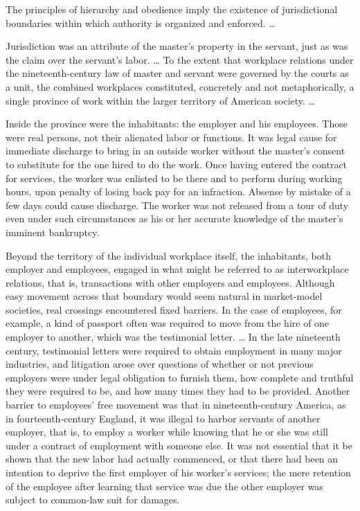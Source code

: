 \documentclass[
  letterpaper,
  11pt,
  DIV=9,
  openright]{scrbook}
\begin{document}
The principles of hierarchy and obedience imply the existence of
jurisdictional boundaries within which authority is organized and
enforced. \ldots{}

Jurisdiction was an attribute of the master's property in the servant,
just as was the claim over the servant's labor. \ldots{} To the extent
that workplace relations under the nineteenth-century law of master and
servant were governed by the courts as a unit, the combined workplaces
constituted, concretely and not metaphorically, a single province of
work within the larger territory of American society. \ldots{}

Inside the province were the inhabitants: the employer and his
employees. Those were real persons, not their alienated labor or
functions. It was legal cause for immediate discharge to bring in an
outside worker without the master's consent to substitute for the one
hired to do the work. Once having entered the contract for services, the
worker was enlisted to be there and to perform during working hours,
upon penalty of losing back pay for an infraction. Absense by mistake of
a few days could cause discharge. The worker was not released from a
tour of duty even under such circumstances as his or her accurate
knowledge of the master's imminent bankruptcy.

Beyond the territory of the individual workplace itself, the
inhabitants, both employer and employees, engaged in what might be
referred to as interworkplace relations, that is, transactions with
other employers and employees. Although easy movement across that
boundary would seem natural in market-model societies, real crossings
encountered fixed barriers. In the case of employees, for example, a
kind of passport often was required to move from the hire of one
employer to another, which was the testimonial letter. \ldots{} In the
late nineteenth century, testimonial letters were required to obtain
employment in many major industries, and litigation arose over questions
of whether or not previous employers were under legal obligation to
furnish them, how complete and truthful they were required to be, and
how many times they had to be provided. Another barrier to employees'
free movement was that in nineteenth-century America, as in
fourteenth-century England, it was illegal to harbor servants of another
employer, that is, to employ a worker while knowing that he or she was
still under a contract of employment with someone else. It was not
essential that it be shown that the new labor had actually commenced, or
that there had been an intention to deprive the first employer of his
worker's services; the mere retention of the employee after learning
that service was due the other employer was subject to common-law suit
for damages.
\end{document}
